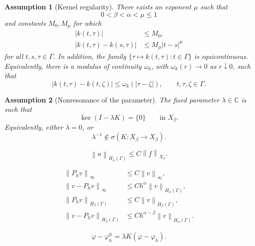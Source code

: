 \documentclass[10pt,a4paper]{amsart}
\newtheorem{assumption}{Assumption}
\newcommand{\C}{\mathbb C}
\newcommand{\Ga}{\Gamma}
\newcommand{\norm}[1]{\left\|#1\right\|}
\begin{document}
\begin{assumption}[Kernel regularity]\label{ass:kernel}
There exists an exponent $\mu$ such that
\[
        0<\beta<\alpha<\mu\le1
\]
and constants $M_0,M_\mu$ for which
\begin{align}
        |k(t,\tau)|&\le M_0,\label{eq:kbound}\\
        |k(t,\tau)-k(s,\tau)|&\le M_\mu|t-s|^\mu\label{eq:kholder}
\end{align}
for all $t,s,\tau\in\Ga$.  In addition, the family $\{\tau\mapsto k(t,\tau):t\in\Ga\}$ is equicontinuous.  Equivalently, there is a modulus of continuity $\omega_k$, with $\omega_k(r)\to0$ as $r\downarrow0$, such that
\begin{equation}\label{eq:kuniformtau}
        |k(t,\tau)-k(t,\zeta)|
        \le \omega_k(|\tau-\zeta|),
        \qquad t,\tau,\zeta\in\Ga.
\end{equation}
\end{assumption}

\begin{assumption}[Nonresonance of the parameter]\label{ass:injectivity}
The fixed parameter $\lambda\in\C$ is such that
\begin{equation}\label{eq:nonresonance}
        \ker(I-\lambda K)=\{0\}
        \qquad\text{in }X_\beta.
\end{equation}
Equivalently, either $\lambda=0$, or
\[
        \lambda^{-1}\notin\sigma(K:X_\beta\to X_\beta).
\]
\end{assumption}

\begin{equation}\label{eq:ubound}
        \norm{u}_{H_\alpha(\Ga)}
        \le C\norm{f}_{X_\alpha}.
\end{equation}

\begin{align}
        \norm{P_hv}_{\infty}
        &\le C\norm{v}_{\infty},\label{eq:Phsupstable}\\
        \norm{v-P_hv}_{\infty}
        &\le Ch^\alpha\norm{v}_{H_\alpha(\Ga)},\label{eq:Phsupapprox}\\
        \norm{P_hv}_{H_\beta(\Ga)}
        &\le C\norm{v}_{H_\beta(\Ga)},\label{eq:Phstable}\\
        \norm{v-P_hv}_{H_\beta(\Ga)}
        &\le Ch^{\alpha-\beta}\norm{v}_{H_\alpha(\Ga)}.
        \label{eq:Phapprox}
\end{align}

\begin{equation}\label{eq:bsh-iterated-error-identity}
        \varphi-\varphi_h^{\mathrm{it}}
        =\lambda K(\varphi-\varphi_h).
\end{equation}
\end{document}
